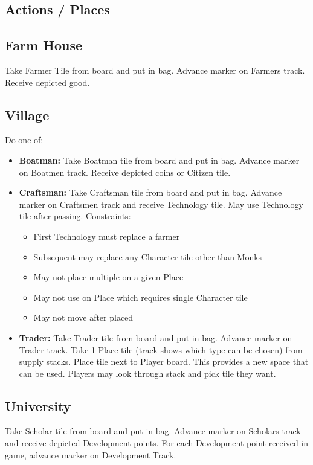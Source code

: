 \documentclass[8pt]{article}
\newenvironment{itemizeCustom}
{\begin{itemize}
  \setlength{\itemsep}{1pt}
  \setlength{\parskip}{0pt}
  \setlength{\parsep}{0pt}}
{\end{itemize}}
\begin{document}
\begin{multicols*}{2}
\section*{Actions / Places}
    \subsection*{Farm House}
    Take Farmer Tile from board and put in bag. Advance marker on Farmers track. Receive depicted good.

    \subsection*{Village}
    Do one of:
    \begin{itemizeCustom}
        \item \textbf{Boatman:} Take Boatman tile from board and put in bag. Advance marker on Boatmen track. Receive depicted coins or Citizen tile.
        \item \textbf{Craftsman:} Take Craftsman tile from board and put in bag. Advance marker on Craftsmen track and receive Technology tile. May use Technology tile after passing. Constraints:
            \begin{itemizeCustom}
                \item First Technology must replace a farmer
                \item Subsequent may replace any Character tile other than Monks
                \item May not place multiple on a given Place
                \item May not use on Place which requires single Character tile
                \item May not move after placed
            \end{itemizeCustom}
        \item \textbf{Trader:} Take Trader tile from board and put in bag. Advance marker on Trader track. Take 1 Place tile (track shows which type can be chosen) from supply stacks. Place tile next to Player board. This provides a new space that can be used. Players may look through stack and pick tile they want.
    \end{itemizeCustom}

    \subsection*{University}
    Take Scholar tile from board and put in bag. Advance marker on Scholars track and receive depicted Development points. For each Development point received in game, advance marker on Development Track.


\end{multicols*}
\end{document}
